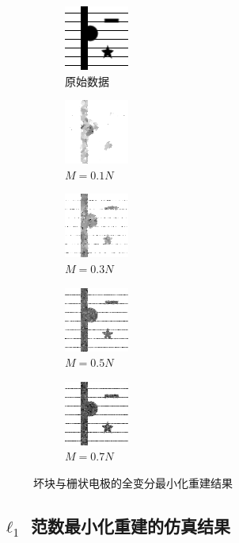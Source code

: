 \begin{figure}
\centering
\begin{subfigure}[t]{1.1in}
	\includegraphics{Figure/testdata/2dsharp_finger.png}
	\caption{原始数据}
\end{subfigure}
\begin{subfigure}[t]{1.1in}
	\includegraphics{Figure/TV/finger10.png}
	\caption{$M = 0.1 N$}
\end{subfigure}
\begin{subfigure}[t]{1.1in}
	\includegraphics{Figure/TV/finger30.png}
	\caption{$M = 0.3 N$}
\end{subfigure}
\begin{subfigure}[t]{1.1in}
	\includegraphics{Figure/TV/finger50.png}
	\caption{$M = 0.5 N$}
\end{subfigure}
\begin{subfigure}[t]{1.1in}
	\includegraphics{Figure/TV/finger70.png}
	\caption{$M = 0.7 N$}
\end{subfigure}
\caption{坏块与栅状电极的全变分最小化重建结果}
\label{fig:TVfinger}
\end{figure}

\subsection{$\ell_1$ 范数最小化重建的仿真结果}


